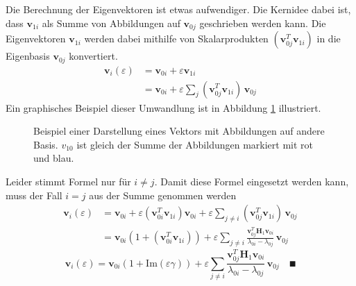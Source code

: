 Die Berechnung der Eigenvektoren ist etwas aufwendiger.
Die Kernidee dabei ist, dass $\bm v_{1i}$ als Summe von Abbildungen auf $\bm v_{0j}$ geschrieben werden kann.
Die Eigenvektoren $\bm v_{1i}$ werden dabei mithilfe von Skalarprodukten $( \bm v_{0j}^T \bm v_{1i})$ in die Eigenbasis $\bm v_{0j}$ konvertiert. %
\begin{align*}
    \bm v_i(\varepsilon)
    &=
    \bm v_{0i} + \varepsilon \bm v_{1i} \\
    &=
    \bm v_{0i} + \varepsilon \sum_{j} ( \bm v_{0j}^T \bm v_{1i}) \, \bm v_{0j}
\end{align*}
Ein graphisches Beispiel dieser Umwandlung ist in Abbildung \ref{ew:fig:scalar_prod} illustriert.
\begin{figure}
    \begin{center}
        
    \end{center}
    \caption[Eigenräume]{
        Beispiel einer Darstellung eines Vektors mit Abbildungen auf andere Basis.
        $v_{10}$ ist gleich der Summe der Abbildungen markiert mit rot und blau.
    } \label{ew:fig:scalar_prod}
\end{figure}
Leider stimmt Formel  nur für $i \neq j$. Damit diese Formel eingesetzt werden kann, muss der Fall $i = j$ aus der Summe genommen werden
\begin{align}
    \bm v_i(\varepsilon)
    &=
    \bm v_{0i} + \varepsilon ( \bm v_{0i}^T \bm v_{1i}) \bm v_{0i} + \varepsilon \sum_{j \neq i} (\bm v_{0j}^T \bm v_{1i}) \, \bm v_{0j} \\
    &=
    \bm v_{0i} ( 1 + (\bm v_{0i}^T \bm v_{1i}) ) + \varepsilon \sum_{j \neq i}
    \frac{\bm v_{0j}^T \bm H_1 \bm v_{0i}}{\lambda_{0i} - \lambda_{0j}}
    \, \bm v_{0j}
\end{align}
\begin{equation}
    \bm v_i(\varepsilon)
    =
    \bm v_{0i} ( 1 + \mathrm{Im}(\varepsilon \gamma) ) + \varepsilon \sum_{j \neq i}
    \frac{\bm v_{0j}^T \bm H_1 \bm v_{0i}}{\lambda_{0i} - \lambda_{0j}}
    \, \bm v_{0j}
    \quad
    \QED
    \label{ew:eq:explicit_eigvecs}
\end{equation}



